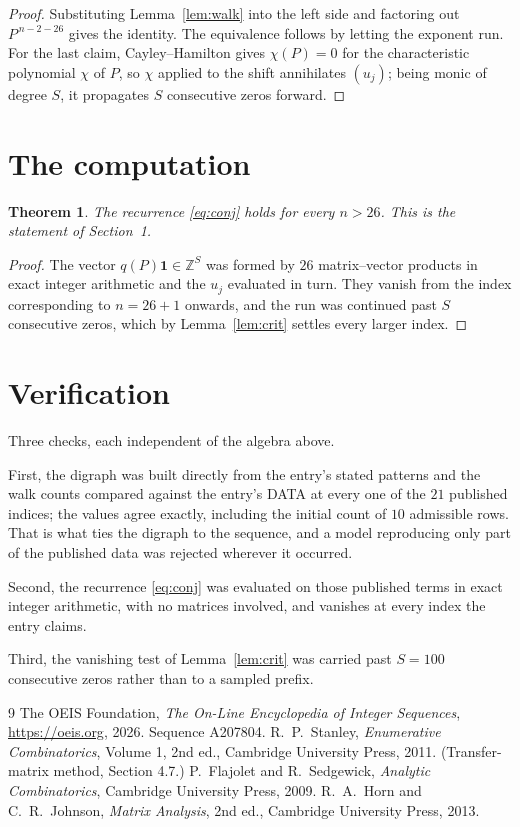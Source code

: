 \documentclass[11pt,a4paper]{article}
\theoremstyle{plain}
\newtheorem{theorem}{Theorem}
\theoremstyle{definition}
\begin{document}
\begin{proof}
Substituting Lemma~\ref{lem:walk} into the left side and factoring out
$P^{\,n-2-26}$ gives the identity. The equivalence follows by letting the exponent
run. For the last claim, Cayley--Hamilton gives $\chi(P)=0$ for the characteristic
polynomial $\chi$ of $P$, so $\chi$ applied to the shift annihilates $(u_j)$; being monic of
degree $S$, it propagates $S$ consecutive zeros forward.
\end{proof}

\section{The computation}

\begin{theorem}
The recurrence \eqref{eq:conj} holds for every $n>26$. This is the statement of
Section~1.
\end{theorem}

\begin{proof}
The vector $q(P)\mathbf{1}\in\mathbb{Z}^{S}$ was formed by $26$ matrix--vector
products in exact integer arithmetic and the $u_j$ evaluated in turn. They vanish from the
index corresponding to $n=26+1$ onwards, and the run was continued past $S$ consecutive
zeros, which by Lemma~\ref{lem:crit} settles every larger index.
\end{proof}

\section{Verification}

Three checks, each independent of the algebra above.

First, the digraph was built directly from the entry's stated patterns and the walk counts
compared against the entry's DATA at every one of the $21$ published indices; the
values agree exactly, including the initial count of $10$ admissible rows. That is
what ties the digraph to the sequence, and a model reproducing only part of the published
data was rejected wherever it occurred.

Second, the recurrence \eqref{eq:conj} was evaluated on those published terms in exact
integer arithmetic, with no matrices involved, and vanishes at every index the entry claims.

Third, the vanishing test of Lemma~\ref{lem:crit} was carried past $S=100$ consecutive
zeros rather than to a sampled prefix.

\begin{thebibliography}{9}
 The OEIS Foundation, \emph{The On-Line Encyclopedia of Integer
Sequences}, \url{https://oeis.org}, 2026. Sequence A207804.
 R.~P.~Stanley, \emph{Enumerative Combinatorics}, Volume 1, 2nd ed.,
Cambridge University Press, 2011. (Transfer-matrix method, Section 4.7.)
 P.~Flajolet and R.~Sedgewick, \emph{Analytic Combinatorics}, Cambridge
University Press, 2009.
 R.~A.~Horn and C.~R.~Johnson, \emph{Matrix Analysis}, 2nd ed., Cambridge
University Press, 2013.
\end{thebibliography}
\end{document}
